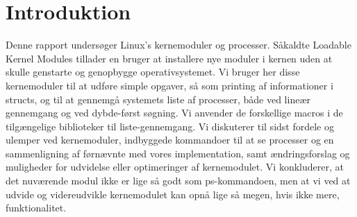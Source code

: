 \chapter{Introduktion}
Denne rapport undersøger Linux's kernemoduler og processer. Såkaldte Loadable Kernel Modules tillader en bruger at installere nye moduler i kernen uden at skulle genstarte og genopbygge operativsystemet. Vi bruger her disse kernemoduler til at udføre simple opgaver, så som printing af informationer i structs, og til at gennemgå systemets liste af processer, både ved lineær gennemgang og ved dybde-først søgning. Vi anvender de forskellige macros i de tilgængelige biblioteker til liste-gennemgang. Vi diskuterer til sidst fordele og ulemper ved kernemoduler, indbyggede kommandoer til at se processer og en sammenligning af førnævnte med vores implementation, samt ændringsforslag og muligheder for udvidelse eller optimeringer af kernemodulet. Vi konkluderer, at det nuværende modul ikke er lige så godt som ps-kommandoen, men at vi ved at udvide og videreudvikle kernemodulet kan opnå lige så megen, hvis ikke mere, funktionalitet.